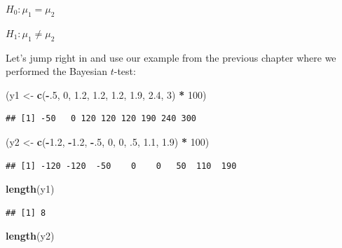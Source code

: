 \documentclass[
]{book}
\newenvironment{Shaded}{\begin{snugshade}}{\end{snugshade}}
\newcommand{\DecValTok}[1]{\textcolor[rgb]{0.00,0.00,0.81}{#1}}
\newcommand{\FloatTok}[1]{\textcolor[rgb]{0.00,0.00,0.81}{#1}}
\newcommand{\FunctionTok}[1]{\textcolor[rgb]{0.13,0.29,0.53}{\textbf{#1}}}
\newcommand{\NormalTok}[1]{#1}
\newcommand{\OtherTok}[1]{\textcolor[rgb]{0.56,0.35,0.01}{#1}}
\newcommand{\SpecialCharTok}[1]{\textcolor[rgb]{0.81,0.36,0.00}{\textbf{#1}}}
\begin{document}
\(H_0: \mu_1 = \mu_2\)

\(H_1: \mu_1 \ne \mu_2\)

Let's jump right in and use our example from the previous chapter where we performed the Bayesian \(t\)-test:

\begin{Shaded}
\begin{Highlighting}[]
\NormalTok{(y1 }\OtherTok{\textless{}{-}} \FunctionTok{c}\NormalTok{(}\SpecialCharTok{{-}}\NormalTok{.}\DecValTok{5}\NormalTok{, }\DecValTok{0}\NormalTok{, }\FloatTok{1.2}\NormalTok{, }\FloatTok{1.2}\NormalTok{, }\FloatTok{1.2}\NormalTok{, }\FloatTok{1.9}\NormalTok{, }\FloatTok{2.4}\NormalTok{, }\DecValTok{3}\NormalTok{) }\SpecialCharTok{*} \DecValTok{100}\NormalTok{)}
\end{Highlighting}
\end{Shaded}

\begin{verbatim}
## [1] -50   0 120 120 120 190 240 300
\end{verbatim}

\begin{Shaded}
\begin{Highlighting}[]
\NormalTok{(y2 }\OtherTok{\textless{}{-}} \FunctionTok{c}\NormalTok{(}\SpecialCharTok{{-}}\FloatTok{1.2}\NormalTok{, }\SpecialCharTok{{-}}\FloatTok{1.2}\NormalTok{, }\SpecialCharTok{{-}}\NormalTok{.}\DecValTok{5}\NormalTok{, }\DecValTok{0}\NormalTok{, }\DecValTok{0}\NormalTok{, .}\DecValTok{5}\NormalTok{, }\FloatTok{1.1}\NormalTok{, }\FloatTok{1.9}\NormalTok{) }\SpecialCharTok{*} \DecValTok{100}\NormalTok{)}
\end{Highlighting}
\end{Shaded}

\begin{verbatim}
## [1] -120 -120  -50    0    0   50  110  190
\end{verbatim}

\begin{Shaded}
\begin{Highlighting}[]
\FunctionTok{length}\NormalTok{(y1)}
\end{Highlighting}
\end{Shaded}

\begin{verbatim}
## [1] 8
\end{verbatim}

\begin{Shaded}
\begin{Highlighting}[]
\FunctionTok{length}\NormalTok{(y2)}
\end{Highlighting}
\end{Shaded}
\end{document}
